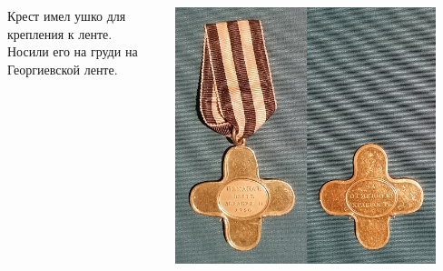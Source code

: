 \begin{frame}{}
	\begin{columns}
		\begin{column}{0.45\textwidth}

			Крест имел ушко для крепления к ленте. Носили его на груди на Георгиевской ленте.

		\end{column}
		\begin{column}{0.45\textwidth}

			\includegraphics[width=0.9\textwidth]{images/medal-2.jpg}

		\end{column}
	\end{columns}
\end{frame}
